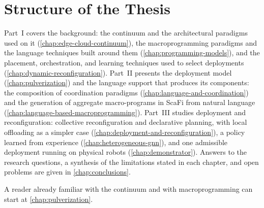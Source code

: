 \section{Structure of the Thesis}
\label{sec:thesis-structure}

Part~I covers the background:
the continuum and the architectural paradigms used on it (\cref{chap:edge-cloud-continuum}),
the macroprogramming paradigms and the language techniques built around them (\cref{chap:programming-models}),
and the placement, orchestration, and learning techniques used to select deployments (\cref{chap:dynamic-reconfiguration}).
%
Part~II presents the deployment model (\cref{chap:pulverization})
and the language support that produces its components:
the composition of coordination paradigms (\cref{chap:language-and-coordination})
and the generation of aggregate macro-programs in ScaFi from natural language (\cref{chap:language-based-macroprogramming}).
%
Part~III studies deployment and reconfiguration:
collective reconfiguration and declarative planning, with local offloading as a simpler case (\cref{chap:deployment-and-reconfiguration}),
a policy learned from experience (\cref{chap:heterogeneous-gnn}),
and one admissible deployment running on physical robots (\cref{chap:demonstrator}).
%
Answers to the research questions, a synthesis of the limitations stated in each chapter,
and open problems are given in \cref{chap:conclusions}.

A reader already familiar with the continuum and with macroprogramming can start at \cref{chap:pulverization}.
